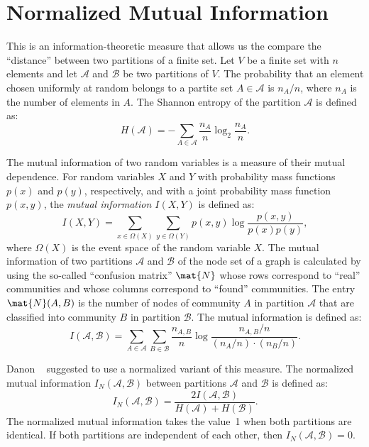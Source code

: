 \section{Normalized Mutual Information}
This is an information-theoretic measure that allows us the 
compare the ``distance'' between two partitions of a finite set. Let $V$ be a finite set 
with $n$ elements and let $\mathcal{A}$ and $\mathcal{B}$ be two partitions of $V$. The probability that an 
element chosen uniformly at random belongs to a partite set $A \in \mathcal{A}$ is $n_A/n$, where $n_A$ 
is the number of elements in $A$. The Shannon entropy of the partition $\mathcal{A}$ 
is defined as:
\begin{equation}\label{eqn:shannon_entropy}
H(\mathcal{A}) = - \sum_{A \in \mathcal{A}} \frac{n_A}{n} \log_2 \frac{n_A}{n}.
\end{equation}

The mutual information of two random variables is a measure of their mutual dependence. For random 
variables $X$ and $Y$ with probability mass functions $p(x)$ and $p(y)$, respectively, and 
with a joint probability mass function $p(x, y)$, the \emph{mutual information $I(X, Y)$} 
is defined as:
\begin{equation}\label{eqn:mutual_information_rv}
I(X, Y) = \sum_{x \in \Omega(X)} \sum_{y \in \Omega(Y)} p(x, y) \log \frac{p(x, y)}{p(x) p(y)},
\end{equation}
where $\Omega(X)$ is the event space of the random variable $X$.
The mutual information of two partitions $\mathcal{A}$ and $\mathcal{B}$ 
of the node set of a graph is calculated by using the so-called ``confusion matrix'' 
$\mat{N}$ whose rows correspond to ``real'' communities and whose columns correspond 
to ``found'' communities. The entry $\mat{N}(A, B)$ is the number of nodes of community 
$A$ in partition $\mathcal{A}$ that are classified into community $B$ in partition $\mathcal{B}$. 
The mutual information is defined as:
\begin{equation}\label{eqn:mutual_information_graphs}
I(\mathcal{A}, \mathcal{B}) = 
	\sum_{A \in \mathcal{A}} \sum_{B \in \mathcal{B}} \frac{n_{A, B}}{n} 
		\log \frac{n_{A, B} / n}{ (n_A / n) \cdot (n_B / n) }.  
\end{equation}

Danon \etal~\cite{DDDA05} suggested to use a normalized variant of this measure. The 
normalized mutual information $I_N(\mathcal{A}, \mathcal{B})$ between partitions 
$\mathcal{A}$ and $\mathcal{B}$ is defined as:
\begin{equation} \label{eqn:normalized_mutual_information}
I_N(\mathcal{A}, \mathcal{B}) =  \frac{2 I(\mathcal{A}, \mathcal{B})}{H(\mathcal{A}) + H(\mathcal{B})}.
\end{equation}
The normalized mutual information takes the value~1 when both partitions are identical. If both partitions 
are independent of each other, then $I_N(\mathcal{A}, \mathcal{B}) = 0$. 

